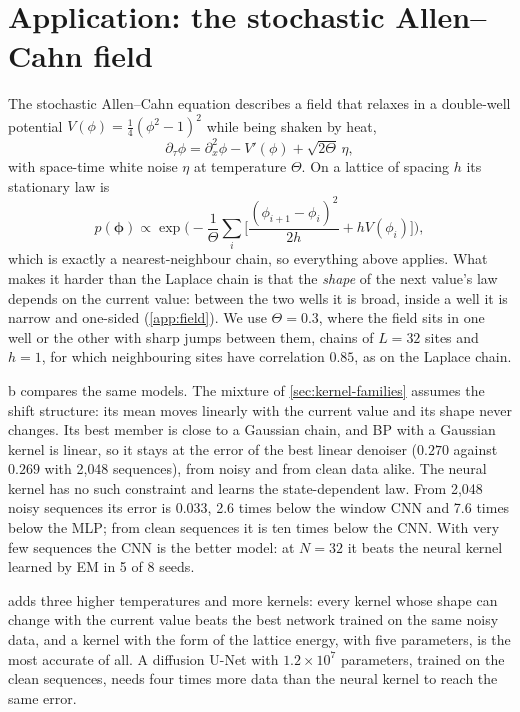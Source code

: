 \section{Application: the stochastic Allen--Cahn field}
\label{sec:allen-cahn}

The stochastic Allen--Cahn equation \cite{allen1979microscopic,dapratozabczyk2014} describes a field that relaxes in a
double-well potential $V(\phi)=\tfrac14(\phi^2-1)^2$ while being shaken by heat,
\begin{equation}
  \partial_\tau\phi=\partial_x^2\phi-V'(\phi)+\sqrt{2\Theta}\,\eta,
\end{equation}
with space-time white noise $\eta$ at temperature $\Theta$. On a lattice of spacing $h$ its stationary law is
\begin{equation}
  p(\boldsymbol\phi)\propto\exp\Big(-\frac1\Theta\sum_i\Big[\frac{(\phi_{i+1}-\phi_i)^2}{2h}+hV(\phi_i)\Big]\Big),
\end{equation}
which is exactly a nearest-neighbour chain, so everything above applies. What makes it harder than the Laplace chain is
that the \emph{shape} of the next value's law depends on the current value: between the two wells it is broad, inside a
well it is narrow and one-sided (\cref{app:field}). We use $\Theta=0.3$, where the field sits in one well or the other
with sharp jumps between them, chains of $L=32$ sites and $h=1$, for which neighbouring sites have correlation $0.85$, as
on the Laplace chain.

b compares the same models. The mixture of \cref{sec:kernel-families} assumes the shift structure:
its mean moves linearly with the current value and its shape never changes. Its best member is close to a Gaussian
chain, and BP with a Gaussian kernel is linear, so it stays at the error of the best linear denoiser ($0.270$ against
$0.269$ with 2{,}048 sequences), from noisy and from clean data alike. The neural kernel has no such constraint and
learns the state-dependent law. From 2{,}048 noisy sequences its error is $0.033$, 2.6 times below the window CNN and
7.6 times below the MLP; from clean sequences it is ten times below the CNN. With very few sequences the CNN is the
better model: at $N=32$ it beats the neural kernel learned by EM in 5 of 8 seeds.

 adds three higher temperatures and more kernels: every kernel whose shape can change with the current
value beats the best network trained on the same noisy data, and a kernel with the form of the lattice energy, with five
parameters, is the most accurate of all. A diffusion U-Net with $1.2\times10^{7}$ parameters, trained on the clean
sequences, needs four times more data than the neural kernel to reach the same error.
